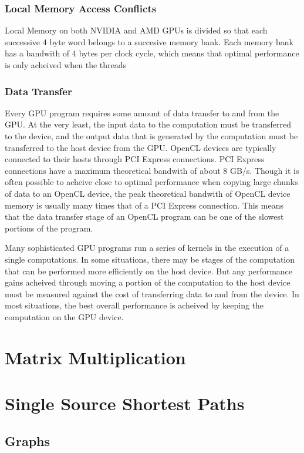 \documentclass[12pt,twoside]{reedthesis}
\begin{document}
\subsection{Local Memory Access Conflicts}

Local Memory on both NVIDIA and AMD GPUs is divided so that each successive 4 byte word belongs to a succesive memory bank. Each memory bank has a bandwith of 4 bytes per clock cycle, which means that optimal performance is only acheived when the threads

\subsection{Data Transfer}

Every GPU program requires some amount of data transfer to and from the GPU. At the very least, the input data to the computation must be transferred to the device, and the output data that is generated by the computation must be transferred to the host device from the GPU. OpenCL devices are typically connected to their hosts through PCI Express connections. PCI Express connections have a maximum theoretical bandwith of about 8 GB/s. Though it is often possible to acheive close to optimal performance when copying large chunks of data to an OpenCL device, the peak theoretical bandwith of OpenCL device memory is usually many times that of a PCI Express connection. This means that the data transfer stage of an OpenCL program can be one of the slowest portions of the program.

Many sophisticated GPU programs run a series of kernels in the execution of a single computations. In some situations, there may be stages of the computation that can be performed more efficiently on the host device. But any performance gains acheived through moving a portion of the computation to the host device must be measured against the cost of transferring data to and from the device. In most situations, the best overall performance is acheived by keeping the computation on the GPU device. 

\chapter{Matrix Multiplication}
\chapter{Single Source Shortest Paths}

\section{Graphs}
\end{document}
